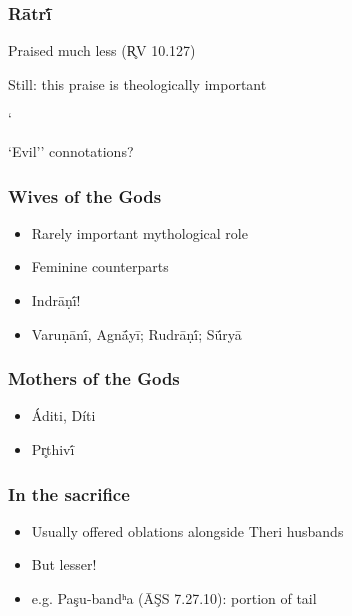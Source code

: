 \documentclass[pdf]{beamer}
\newcommand{\Subitem}[1]{{\setlength\itemindent{12pt} \item[-] #1}}
\begin{document}
\begin{frame} \frametitle{Rātrī́}
\begin{itemize}
	\item Praised much less (R̥V 10.127)
	\item Still: this praise is theologically important
	\Subitem ``Evil'' connotations?
\end{itemize}
\end{frame}

\begin{frame} \frametitle{Wives of the Gods}
\begin{itemize}
	\item Rarely important mythological role
	\item Feminine counterparts
	\item Indrāṇī́!
	\item Varuṇānī́, Agnā́yī; Rudrāṇī́; Sū́ryā
\end{itemize}
\end{frame}

\begin{frame} \frametitle{Mothers of the Gods}
\begin{itemize}
	\item Áditi, Díti
	\item Pr̥thivī́
\end{itemize}
\end{frame}

\begin{frame} \frametitle{In the sacrifice}
\begin{itemize}
	\item Usually offered oblations alongside Theri husbands
	\item But lesser!
	\item e.g. Paşu-bandʰa (ĀŞS 7.27.10): portion of tail
\end{itemize}
\end{frame}
\end{document}
